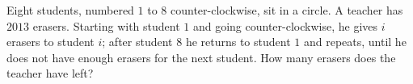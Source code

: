 Eight students, numbered $1$ to $8$ counter-clockwise, sit in a circle. A teacher has $2013$ erasers. Starting with student $1$ and going counter-clockwise, he gives $i$ erasers to student $i$; after student $8$ he returns to student $1$ and repeats, until he does not have enough erasers for the next student. How many erasers does the teacher have left?
